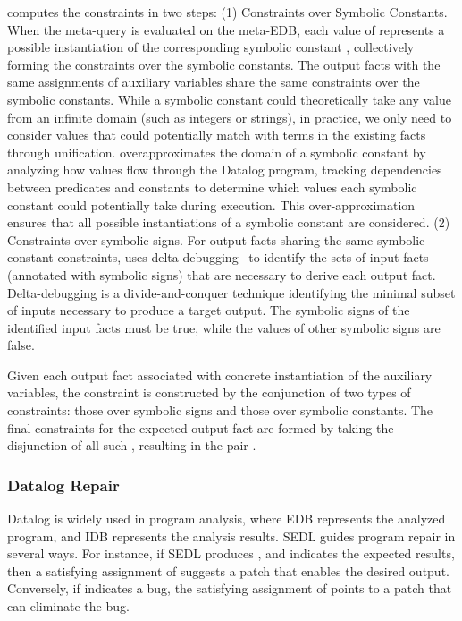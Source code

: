 \Symlog computes the constraints in two steps:
(1) Constraints over Symbolic Constants.
When the meta-query is evaluated on the meta-EDB, each value of  represents a possible instantiation of the corresponding symbolic constant , collectively forming the constraints over the symbolic constants.
The output facts with the same assignments of auxiliary variables share the same constraints over the symbolic constants.
While a symbolic constant could theoretically take any value from an infinite domain (such as integers or strings), in practice, we only need to consider values that could potentially match with terms in the existing facts through unification.
\Symlog overapproximates the domain of a symbolic constant by analyzing how values flow through the Datalog program, tracking dependencies between predicates and constants to determine which values each symbolic constant could potentially take during execution.
This over-approximation ensures that all possible instantiations of a symbolic constant are considered. 
(2) Constraints over symbolic signs.
For output facts sharing the same symbolic constant constraints, \Symlog uses delta-debugging~\cite{zeller1999yesterday} to identify the sets of input facts (annotated with symbolic signs) that are necessary to derive each output fact.
Delta-debugging is a divide-and-conquer technique identifying the minimal subset of inputs necessary to produce a target output.
The symbolic signs of the identified input facts must be true, while the values of other symbolic signs are false. 


Given each output fact associated with concrete instantiation of the auxiliary variables, the constraint \code{\psi} %
is constructed by the conjunction of two types of constraints: those over symbolic signs and those over symbolic constants.
The final constraints for the expected output fact are formed by taking the disjunction of all such \code{\psi}, resulting in the pair .


\subsubsection{Datalog Repair}
Datalog is widely used in program analysis, where EDB represents the analyzed program, and IDB represents the analysis results. 
SEDL guides program repair in several ways. For instance, if SEDL produces  \code{(\relation, \psi^*)}, and \code{\relation} indicates the expected results, then a satisfying assignment of \code{\psi^*} suggests a patch that enables the desired output. Conversely, if \code{\relation} indicates a bug, the satisfying assignment of \code{\neg\psi^*} points to a patch that can eliminate the bug. 


